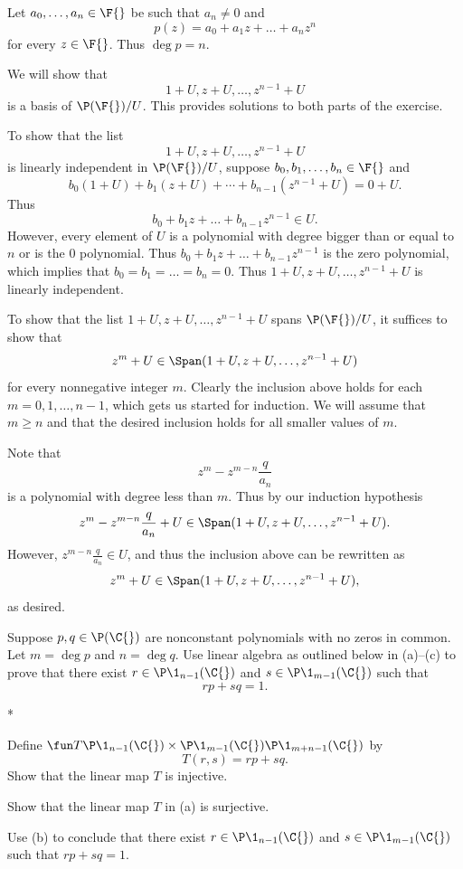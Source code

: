 \begin{Solution}
Let $a_0, \dots, a_n \in \F{}$ be such that $a_n \ne 0$ and
\[
p(z) = a_0 + a_1 z + \dots + a_n z^n
\]
for every $z \in \F{}$. Thus $\deg p = n$.

We will show that
\[
1+ U, z + U, \dots, z^{n-1} + U
\]
is a basis of $\P(\F{})/U$. This provides solutions to both parts of the exercise.

To show that the list
\[
1+ U, z + U, \dots, z^{n-1} + U
\]
is linearly independent in $\P(\F{})/U$, suppose $b_0, b_1, \dots, b_n \in \F{}$ and
\[
b_0(1+ U) + b_1( z + U) + \cdots+ b_{n-1} (z^{n-1} + U) = 0 + U.
\]
Thus
\[
b_0 + b_1 z + \dots + b_{n-1} z^{n-1} \in U.
\]
However, every element of $U$ is a polynomial with degree bigger than or equal to $n$ or is the $0$ polynomial. Thus $b_0 + b_1 z + \dots + b_{n-1} z^{n-1}$ is the zero polynomial, which implies that
$b_0 = b_1 = \dots = b_n = 0$. Thus $1+ U, z + U, \dots, z^{n-1} + U$ is linearly independent.

To show that the list $1+ U, z + U, \dots, z^{n-1} + U$ spans $\P(\F{})/U$, it suffices to show that
\[
z^m + U \in \Span( 1+ U, z + U, \dots, z^{n-1} + U )
\]
for every nonnegative integer $m$. Clearly the inclusion above holds for each $m = 0, 1, \dots, n-1$, which gets us started for induction. We will assume that $m \ge n$ and that the desired inclusion holds for all smaller values of $m$.

Note that
\[
z^m - z^{m-n} \frac{q}{a_n}
\]
is a polynomial with degree less than $m$. Thus by our induction hypothesis
\[
z^m - z^{m-n} \frac{q}{a_n} + U \in \Span( 1+ U, z + U, \dots, z^{n-1} + U ).
\]
However, $z^{m-n} \frac{q}{a_n} \in U$, and thus the inclusion above can be rewritten as
\[
z^m  + U \in \Span( 1+ U, z + U, \dots, z^{n-1} + U ),
\]
as desired.
\end{Solution}

\exercise
Suppose $p, q \in \P(\C{})$ are nonconstant polynomials with no zeros in common. Let $m = \deg p$ and $n = \deg q$. Use linear algebra as outlined below in (a)--(c) to prove that there exist
$r \in \P\1_{n-1}(\C{})$ and $s \in \P\1_{m-1}(\C{})$ such that
\[
rp + sq = 1.
\]
\begin{subtheorem}*
\item
Define $\fun T { \P\1_{n-1}(\C{}) \times \P\1_{m-1}(\C{}) } {\P\1_{m+n-1}(\C{})}$ by
\[
T(r, s) = rp + sq.
\]
Show that the linear map $T$ is injective.
\item
Show that the linear map $T$ in (a) is surjective.
\item
Use (b) to conclude that there exist $r \in \P\1_{n-1}(\C{})$ and $s \in \P\1_{m-1}(\C{})$ such that $rp + sq = 1$.
\end{subtheorem}

